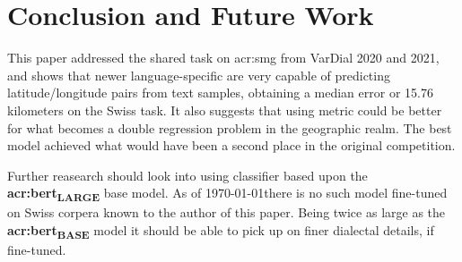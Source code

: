 \section{Conclusion and Future Work}
\label{sec:Conclusion}

\begin{comment}
What are the main contributions? How significant are they?
Discuss the contributions in terms of the initial goal formulated in the Introduction.

Also consider how you think the work could be extended or improved, or what you could have done differently.
\end{comment}

This paper addressed the shared task on \acrlong{acr:smg} from VarDial 2020 and 2021, and shows that newer language-specific  are very capable of predicting latitude/longitude pairs from text samples, obtaining a median error or 15.76 kilometers on the Swiss task. It also suggests that using metric  could be better for what becomes a double regression problem in the geographic realm. The best model achieved what would have been a second place in the original competition.

Further reasearch should look into using classifier based upon the \textbf{\acrshort{acr:bert}\textsubscript{LARGE}} base model. As of \today there is no such model fine-tuned on Swiss corpera known to the author of this paper. Being twice as large as the \textbf{\acrshort{acr:bert}\textsubscript{BASE}} model it should be able to pick up on finer dialectal details, if fine-tuned.

